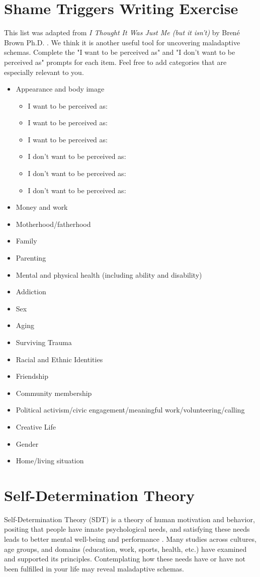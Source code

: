 \documentclass[12pt,letterpaper]{book}
\begin{document}
\section{Shame Triggers Writing Exercise}
\label{sec:shametriggers}
This list was adapted from \textit{I Thought It Was Just Me (but it isn't)} by Brené Brown Ph.D. \cite{brownThought}. We think it is another useful tool for uncovering maladaptive schemas. Complete the "I want to be perceived as" and "I don't want to be perceived as" prompts for each item. Feel free to add categories that are especially relevant to you.

\begin{itemize}
    \item Appearance and body image
    \begin{itemize}
        \item I want to be perceived as:
        \item I want to be perceived as:
        \item I want to be perceived as:
        \item I don't want to be perceived as:
        \item I don't want to be perceived as:
        \item I don't want to be perceived as:
    \end{itemize}
    \item Money and work
    \item Motherhood/fatherhood
    \item Family
    \item Parenting
    \item Mental and physical health (including ability and disability)
    \item Addiction
    \item Sex
    \item Aging
    \item Surviving Trauma
    \item Racial and Ethnic Identities
    \item Friendship
    \item Community membership
    \item Political activism/civic engagement/meaningful work/volunteering/calling
    \item Creative Life
    \item Gender
    \item Home/living situation
\end{itemize}
\section{Self-Determination Theory}
\label{sec:sdt}
Self-Determination Theory (SDT) is a theory of human motivation and behavior, positing that people have innate psychological needs, and satisfying these needs leads to better mental well-being and performance \cite{deciSDT}. Many studies across cultures, age groups, and domains (education, work, sports, health, etc.) have examined and supported its principles. Contemplating how these needs have or have not been fulfilled in your life may reveal maladaptive schemas.
\end{document}
